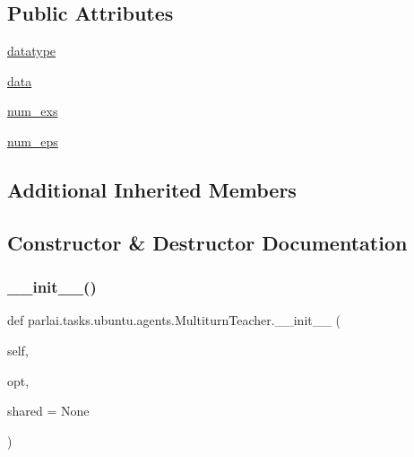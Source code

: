 \subsection*{Public Attributes}
\begin{DoxyCompactItemize}
\item 
\hyperlink{classparlai_1_1tasks_1_1ubuntu_1_1agents_1_1MultiturnTeacher_a6e07d1f855fea7080206ec095407065c}{datatype}
\item 
\hyperlink{classparlai_1_1tasks_1_1ubuntu_1_1agents_1_1MultiturnTeacher_a0746041b61b1174f04efa5e19c6ec55d}{data}
\item 
\hyperlink{classparlai_1_1tasks_1_1ubuntu_1_1agents_1_1MultiturnTeacher_a71904bff60bd65a5f4cad98df1f55a3b}{num\+\_\+exs}
\item 
\hyperlink{classparlai_1_1tasks_1_1ubuntu_1_1agents_1_1MultiturnTeacher_a6b629627b3d8a7e0a5c05e4265e50c35}{num\+\_\+eps}
\end{DoxyCompactItemize}
\subsection*{Additional Inherited Members}


\subsection{Constructor \& Destructor Documentation}
\mbox{\label{classparlai_1_1tasks_1_1ubuntu_1_1agents_1_1MultiturnTeacher_acf41b09581b173c90820787ebe77116e}} 
\subsubsection{\texorpdfstring{\+\_\+\+\_\+init\+\_\+\+\_\+()}{\_\_init\_\_()}}
{\footnotesize\ttfamily def parlai.\+tasks.\+ubuntu.\+agents.\+Multiturn\+Teacher.\+\_\+\+\_\+init\+\_\+\+\_\+ (\begin{DoxyParamCaption}\item[{}]{self,  }\item[{}]{opt,  }\item[{}]{shared = {\ttfamily None} }\end{DoxyParamCaption})}



